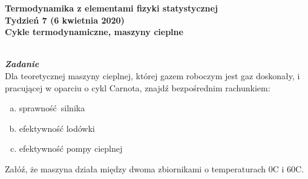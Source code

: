 \documentclass[11pt,a4paper]{article}
\newcounter{zadanie}\newcommand{\zadanie}[1][]{\addtocounter{zadanie}{1} ~\\  {\bf \emph{Zadanie \arabic{zadanie} #1 }} \\}
\begin{document}

\begin{centering}
\bf{\Large{Termodynamika z elementami fizyki statystycznej}}\\
Tydzień 7 (6 kwietnia 2020)\\[3mm]
Cykle termodynamiczne, maszyny cieplne\\
\end{centering} 
\vspace{5mm}

\zadanie
Dla teoretycznej maszyny cieplnej, której gazem roboczym jest gaz doskonały, 
i pracującej w oparciu o cykl Carnota, znajdź bezpośrednim rachunkiem:
\begin{enumerate}[a)]
\item sprawność silnika
\item efektywność lodówki
\item efektywność pompy cieplnej
\end{enumerate}
Załóź, że maszyna działa między dwoma zbiornikami o temperaturach 0\degree C i 60\degree C.\\
\end{document}
